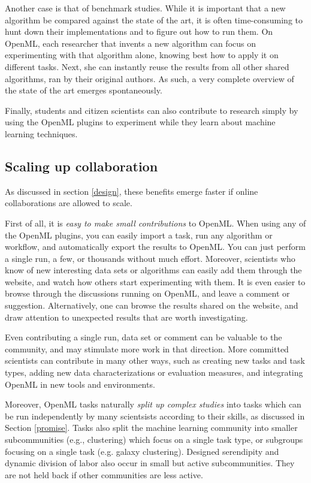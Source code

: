 \documentclass{acmproc-sp}
\begin{document}
Another case is that of benchmark studies. While it is important that a new algorithm be compared against the state of the art, it is often time-consuming to hunt down their implementations and to figure out how to run them. On OpenML, each researcher that invents a new algorithm can focus on experimenting with that algorithm alone, knowing best how to apply it on different tasks. Next, she can instantly reuse the results from all other shared algorithms, ran by their original authors. As such, a very complete overview of the state of the art emerges spontaneously.

Finally, students and citizen scientists can also contribute to research simply by using the OpenML plugins to experiment while they learn about machine learning techniques.

\subsection{Scaling up collaboration}
\label{tool}
As discussed in section \ref{design}, these benefits emerge faster if online collaborations are allowed to scale.

First of all, it is \textit{easy to make small contributions} to OpenML. When using any of the OpenML plugins, you can easily import a task, run any algorithm or workflow, and automatically export the results to OpenML. You can just perform a single run, a few, or thousands without much effort. Moreover, scientists who know of new interesting data sets or algorithms can easily add them through the website, and watch how others start experimenting with them. It is even easier to browse through the discussions running on OpenML, and leave a comment or suggestion. Alternatively, one can browse the results shared on the website, and draw attention to unexpected results that are worth investigating. %

Even contributing a single run, data set or comment can be valuable to the community, and may stimulate more work in that direction. More committed scientists can contribute in many other ways, such as creating new tasks and task types, adding new data characterizations or evaluation measures, and integrating OpenML in new tools and environments.

Moreover, OpenML tasks naturally \textit{split up complex studies} into tasks which can be run independently by many scientsists according to their skills, as discussed in Section \ref{promise}. Tasks also split the machine learning community into smaller subcommunities (e.g., clustering) which focus on a single task type, or subgroups focusing on a single task (e.g. galaxy clustering). Designed serendipity and dynamic division of labor also occur in small but active subcommunities. They are not held back if other communities are less active.
\end{document}
